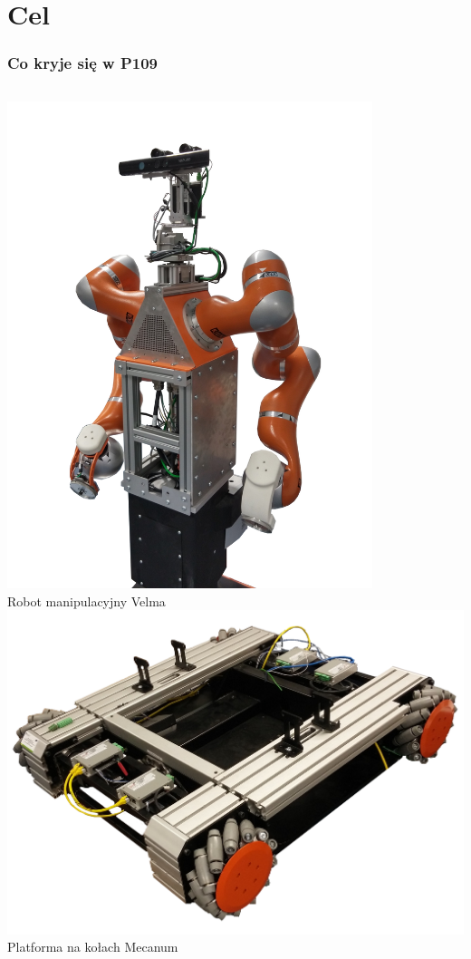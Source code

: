 \documentclass{beamer}
\begin{document}
	\section{Cel}
	\begin{frame}
		\frametitle{Co kryje się w P109}
		\begin{columns}[c]
			\centering
			\includegraphics[width=0.8\textwidth]{graphics/velma.png} \\
			Robot manipulacyjny Velma
			\centering
			\includegraphics[width=\textwidth]{graphics/omnivelma.png} \\
			Platforma na kołach Mecanum
		\end{columns}
	\end{frame}
\end{document}
